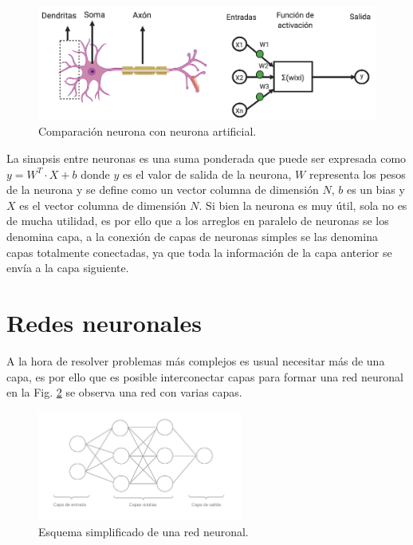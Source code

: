 \begin{figure}[h]
    \centering
    \includegraphics[width=1\textwidth]{imgs/comparacion-neurona-red.png}
    \caption{Comparación neurona con neurona artificial.}
    \label{fig:comparativa-neuronas}
\end{figure}

La sinapsis entre neuronas es una suma ponderada que puede ser expresada como $y =W^T \cdot X + b$ donde $y$ es el valor de salida de la neurona,
$W$ representa los pesos de la neurona y se define como un vector columna de dimensión $N$, $b$ es un bias y $X$ es el vector columna de dimensión $N$. Si bien la neurona es muy útil, sola no es de mucha utilidad, es por ello que a los arreglos en paralelo de neuronas se los denomina capa, a la conexión de capas de neuronas simples se las denomina capas totalmente conectadas, ya que toda la información de la capa anterior se envía a la capa siguiente.

\section{Redes neuronales}

A la hora de resolver problemas más complejos es usual necesitar más de una capa, es por ello que es posible interconectar capas para formar una red neuronal en la Fig. \ref{fig:esquema-redes} se observa una red con varias capas.

\begin{figure}[h]
    \centering
    \includegraphics[width=0.6\textwidth]{imgs/Redes-esquema.jpg}
    \caption{Esquema simplificado de una red neuronal.}
    \label{fig:esquema-redes}
\end{figure}

